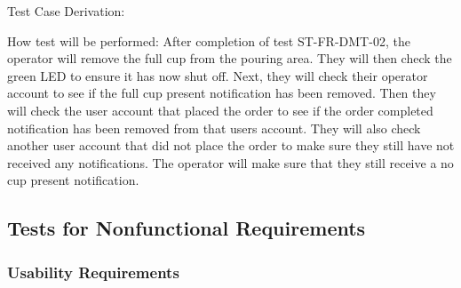 \documentclass[12pt, titlepage]{article}
\begin{document}
\begin{enumerate}
Test Case Derivation: 

How test will be performed: After completion of test ST-FR-DMT-02, the operator will remove the full cup from the pouring area. They will then check the green LED to ensure it has now shut off. Next, they will check their operator account to see if the full cup present notification has been removed. Then they will check the user account that placed the order to see if the order completed notification has been removed from that users account. They will also check another user account that did not place the order to make sure they still have not received any notifications. The operator will make sure that they still receive a no cup present notification.

\end{enumerate}

\subsection{Tests for Nonfunctional Requirements}



\subsubsection{Usability Requirements}
\end{document}
